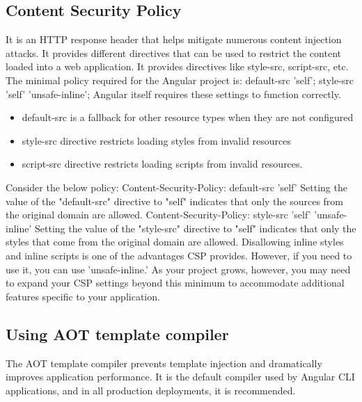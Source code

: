 \documentclass{report}
\begin{document}
\subsection*{Content Security Policy}
It is an HTTP response header that helps mitigate numerous content injection attacks. It provides different directives that can be used to restrict the content loaded into a web application. It provides directives like style-src, script-src, etc.
The minimal policy required for the Angular project is:
default-src 'self'; style-src 'self' 'unsafe-inline';
Angular itself requires these settings to function correctly.
\begin{itemize}
	\item{default-src is a fallback for other resource types when they are not configured}
	\item{style-src directive restricts loading styles from invalid resources}
	\item{script-src directive restricts loading scripts from invalid resources.}
\end{itemize}
Consider the below policy:
Content-Security-Policy: default-src 'self' 
Setting the value of the "default-src" directive to "self" indicates that only the sources from the original domain are allowed.
Content-Security-Policy: style-src 'self' 'unsafe-inline'
Setting the value of the "style-src" directive to "self" indicates that only the styles that come from the original domain are allowed.
Disallowing inline styles and inline scripts is one of the advantages CSP provides. However, if you need to use it, you can use 'unsafe-inline.' 
As your project grows, however, you may need to expand your CSP settings beyond this minimum to accommodate additional features specific to your application.
\subsection*{Using AOT template compiler}
The AOT template compiler prevents template injection and dramatically improves application performance. It is the default compiler used by Angular CLI applications, and in all production deployments, it is recommended.
\end{document}

